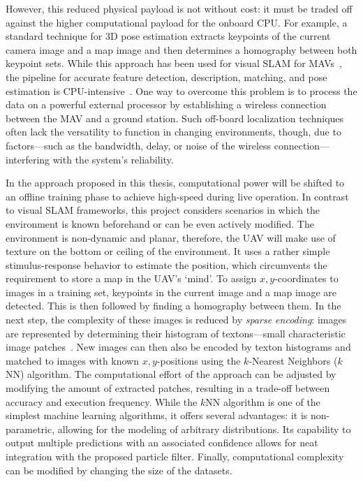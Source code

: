 However, this reduced physical payload is not without cost: it must be
traded off against the higher computational payload for the onboard
CPU. For example, a standard technique for 3D pose estimation extracts
keypoints of the current camera image and a map image and then
determines a homography between both keypoint sets. While this
approach has been used for visual SLAM for
MAVs~\cite{blosch2010vision}, the pipeline for accurate feature
detection, description, matching, and pose estimation is
CPU-intensive~\cite{kendall2015convolutional}.
One way to overcome this problem is to process the data on a powerful
external processor by establishing a wireless connection between the
MAV and a ground station. Such off-board localization techniques often
lack the versatility to function in changing environments, though, due
to factors---such as the bandwidth, delay, or noise of the wireless
connection---interfering with the system's reliability.

In the approach proposed in this thesis, computational power will be
shifted to an offline training phase to achieve high-speed during live
operation. In contrast to visual SLAM frameworks, this project considers
scenarios in which the environment is known beforehand or can be even
actively modified. The environment is non-dynamic and planar, therefore, the UAV will make use of texture on the bottom or ceiling of the environment.
 It uses a rather simple stimulus-response behavior to
estimate the position, which circumvents the requirement to store a
map in the UAV's `mind'. To assign $x,y$-coordinates to images in a
training set, keypoints in the current image and a map image are
detected. This is then followed by finding a homography between
them. In the next step, the complexity of these images is reduced by
\emph{sparse encoding}: images are represented by determining their
histogram of textons---small characteristic image
patches~\cite{varma2005statistical}.
New images can then also be encoded by texton histograms and matched
to images with known $x,y$-positions using the $k$-Nearest Neighbors
($k$NN) algorithm. The computational effort of the approach can be
adjusted by modifying the amount of extracted patches, resulting in a
trade-off between accuracy and execution frequency. While the $k$NN
algorithm is one of the simplest machine learning algorithms, it
offers several advantages: it is non-parametric, allowing for the
modeling of arbitrary distributions. Its capability to output multiple
predictions with an associated confidence allows for neat integration
with the proposed particle filter. Finally, computational complexity
can be modified by changing the size of the datasets.


